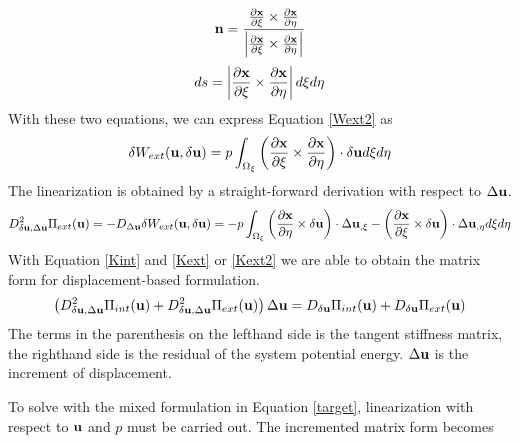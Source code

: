\begin{equation}
\bold{n} = \frac{  \frac{\partial{\bold{x}}}{\partial{\xi}} \times  \frac{\partial{\bold{x}}}{\partial{\eta}} }{\left| \frac{\partial{\bold{x}}}{\partial{\xi}} \times  \frac{\partial{\bold{x}}}{\partial{\eta}} \right|}
\end{equation}
\begin{equation}
ds = \left|\frac{\partial{\bold{x}}}{\partial{\xi}} \times  \frac{\partial{\bold{x}}}{\partial{\eta}}\right| d\xi{d\eta}
\end{equation}
With these two equations, we can express Equation \ref{Wext2} as
\begin{equation}
\delta{W_{ext}}(\bold{u}, \delta{\bold{u}}) = p\int_{\Omega_{\xi}}  \left(\frac{\partial{\bold{x}}}{\partial{\xi}} \times  \frac{\partial{\bold{x}}}{\partial{\eta}}\right) \cdot\delta{\bold{u}}d\xi{d\eta}
\end{equation}
The linearization is obtained by a straight-forward derivation with respect to $\Delta\bold{u}$. 
\begin{equation}  \label{Kext2}
D^2_{\delta\bold{u}, \Delta\bold{u}}\Pi_{ext}(\bold{u}) = - D_{\Delta{\bold{u}}}\delta{W_{ext}}(\bold{u}, \delta{\bold{u}}) = - p\int_{\Omega_{\xi}}  \left(\frac{\partial{\bold{x}}}{\partial{\eta}} \times \delta\bold{u}\right) \cdot\Delta{\bold{u}}_{,\xi} - 
\left(\frac{\partial{\bold{x}}}{\partial{\xi}} \times \delta\bold{u}\right) \cdot\Delta{\bold{u}}_{,\eta} d\xi{d\eta}
\end{equation}
With Equation \ref{Kint} and \ref{Kext} or \ref{Kext2} we are able to obtain the matrix form for displacement-based formulation.
\begin{equation} \label{matrix}
\left( D^2_{\delta\bold{u}, \Delta\bold{u}}\Pi_{int}(\bold{u}) + D^2_{\delta\bold{u}, \Delta\bold{u}}\Pi_{ext}(\bold{u})  \right) \Delta\bold{u} = D_{\delta\bold{u}}\Pi_{int}(\bold{u}) + D_{\delta\bold{u}}\Pi_{ext}(\bold{u})
\end{equation}
The terms in the parenthesis on the lefthand side is the tangent stiffness matrix, the righthand side is the residual of the system potential energy. $\Delta\bold{u}$ is the increment of displacement. 

To solve with the mixed formulation in Equation \ref{target}, linearization with respect to $\bold{u}$ and $p$ must be carried out. The incremented matrix form becomes

